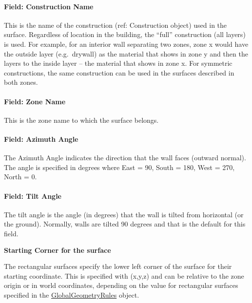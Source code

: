 \paragraph{Field: Construction Name}\label{field-construction-name-1-001}

This is the name of the construction (ref: Construction object) used in the surface. Regardless of location in the building, the ``full'' construction (all layers) is used. For example, for an interior wall separating two zones, zone x would have the outside layer (e.g.~drywall) as the material that shows in zone y and then the layers to the inside layer -- the material that shows in zone x. For symmetric constructions, the same construction can be used in the surfaces described in both zones.

\paragraph{Field: Zone Name}\label{field-zone-name-1-009}

This is the zone name to which the surface belongs.

\paragraph{Field: Azimuth Angle}\label{field-azimuth-angle-1}

The Azimuth Angle indicates the direction that the wall faces (outward normal). The angle is specified in degrees where East = 90, South = 180, West = 270, North = 0.

\paragraph{Field: Tilt Angle}\label{field-tilt-angle-1}

The tilt angle is the angle (in degrees) that the wall is tilted from horizontal (or the ground). Normally, walls are tilted 90 degrees and that is the default for this field.

\begin{callout}
\textbf{Starting Corner for the surface}

The rectangular surfaces specify the lower left corner of the surface for their starting coordinate. This is specified with (x,y,z) and can be relative to the zone origin or in world coordinates, depending on the value for rectangular surfaces specified in the \hyperref[globalgeometryrules]{GlobalGeometryRules} object.
\end{callout}


